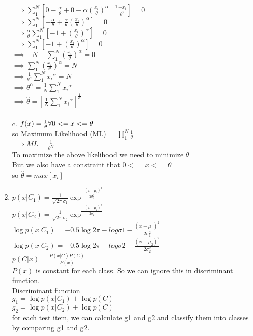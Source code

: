 \documentclass[]{report}
\begin{document}
\begin{enumerate}
	$\implies \sum_{1}^{N} [0 -\frac{\alpha}{\theta} + 0 - \alpha (\frac{x_{i}}{\theta})^{\alpha -1} \frac{-x_{i}}{\theta ^2}] = 0$\\
	$\implies \sum_{1}^{N} [-\frac{\alpha}{\theta} + \frac{\alpha}{\theta} (\frac{x_{i}}{\theta})^{\alpha} ] = 0$\\
	$\implies \frac{\alpha}{\theta} \sum_{1}^{N} [-1 + (\frac{x_{i}}{\theta})^{\alpha} ] = 0$\\
	$\implies \sum_{1}^{N} [-1 + (\frac{x_{i}}{\theta})^{\alpha} ] = 0$\\
	$\implies -N + \sum_{1}^{N} (\frac{x_{i}}{\theta})^{\alpha} = 0$\\
	$\implies \sum_{1}^{N} (\frac{x_{i}}{\theta})^{\alpha} = N$\\	
	$\implies \frac{1}{\theta^\alpha}\sum_{1}^{N} {x_{i}}^{\alpha} = N $\\
	$\implies \theta^\alpha = \frac{1}{N} \sum_{1}^{N} {x_{i}}^{\alpha}$\\
	$\implies \hat{\theta} = [\frac{1}{N} \sum_{1}^{N} {x_{i}}^{\alpha}] ^{\frac{1}{\alpha}}$\\
	\\
	c. $f(x)= \frac{1}{\theta} \space\space\space \forall 0 <= x <= \theta$\\
	so Maximum Likelihood (ML) = $\prod_{1}^{N}\frac{1}{\theta}$\\
	$\implies ML =\frac{1}{\theta^N}$\\
	To maximize the above likelihood we need to minimize $\theta$ \\
	But we also have a constraint that $0 <= x <= \theta$
	\\so $\hat{\theta} = max[{x_{i}}]$
	
	\item 
	$p(x|C_{1}) = \frac{1}{\sqrt{2\pi}\sigma_{1}}\exp^\frac{-(x-\mu_{1})^2}{2\sigma_{1}^2}$\\
	$p(x|C_{2}) = \frac{1}{\sqrt{2\pi}\sigma_{2}}\exp^\frac{-(x-\mu_{2})^2}{2\sigma_{2}^2}$\\
	$\log p(x|C_{1}) = -0.5\log 2\pi - log \sigma1 -\frac{(x-\mu_{1})^2}{2\sigma_{1}^2}$\\
	$\log p(x|C_{2}) = -0.5\log 2\pi - log \sigma2 -\frac{(x-\mu_{2})^2}{2\sigma_{2}^2}$\\
	$p(C|x) = \frac{P(x|C)P(C)}{P(x)}$\\
	$P(x)$ is constant for each class. So we can ignore this in discriminant function.\\
	Discriminant function \\
	$g_{1} = \log p(x|C_{1}) + \log p(C)$\\
	$g_{2} = \log p(x|C_{2}) + \log p(C)$\\
	for each test item, we can calculate g1 and g2 and classify them into classes by comparing g1 and g2.
	

\end{enumerate}
\end{document}

